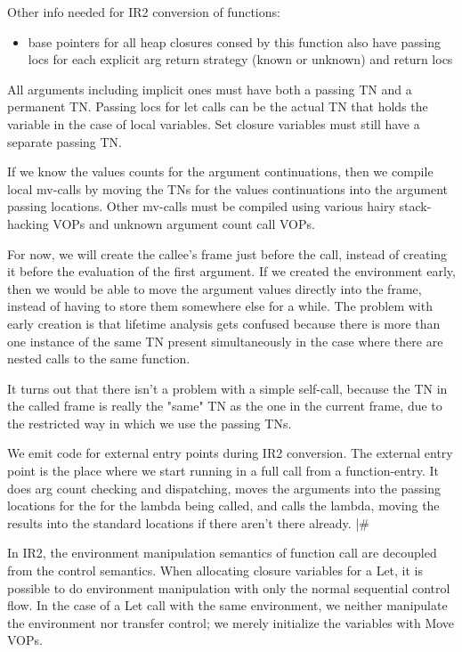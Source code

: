 {\begin{itemize, spread 0, spacing 1}
Other info needed for IR2 conversion of functions:
\begin{itemize}
\item base pointers for all heap closures consed by this function also
  have passing locs for each explicit arg return strategy (known or
  unknown) and return locs
\end{itemize}


All arguments including implicit ones must have both a passing TN and a
permanent TN.  Passing locs for let calls can be the actual TN that holds the
variable in the case of local variables.  Set closure variables must still have
a separate passing TN.

If we know the values counts for the argument continuations, then we compile
local mv-calls by moving the TNs for the values continuations into the argument
passing locations.  Other mv-calls must be compiled using various hairy
stack-hacking VOPs and unknown argument count call VOPs.

For now, we will create the callee's frame just before the call, instead of
creating it before the evaluation of the first argument.  If we created the
environment early, then we would be able to move the argument values directly
into the frame, instead of having to store them somewhere else for a while.
The problem with early creation is that lifetime analysis gets confused because
there is more than one instance of the same TN present simultaneously in the
case where there are nested calls to the same function.

It turns out that there isn't a problem with a simple self-call, because the TN
in the called frame is really the "same" TN as the one in the current frame,
due to the restricted way in which we use the passing TNs.

We emit code for external entry points during IR2 conversion.  The external
entry point is the place where we start running in a full call from a
function-entry.  It does arg count checking and dispatching, moves the
arguments into the passing locations for the for the lambda being called, and
calls the lambda, moving the results into the standard locations if there
aren't there already.
|\#


In IR2, the environment manipulation semantics of function call are decoupled
from the control semantics.  When allocating closure variables for a Let, it is
possible to do environment manipulation with only the normal sequential control
flow.  In the case of a Let call with the same environment, we neither
manipulate the environment nor transfer control; we merely initialize the
variables with Move VOPs.


\end{itemize, spread 0, spacing 1}}
